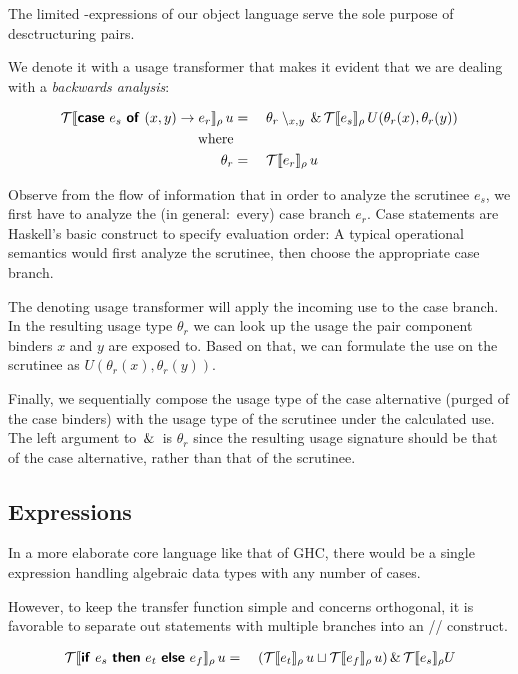 The limited -expressions of our object language serve the sole purpose of desctructuring pairs.

We denote it with a usage transformer that makes it evident that we are dealing with a \emph{backwards analysis}:

\begin{alignat*}{2}
  \mathcal{T}\llbracket\text{\textsf{\textbf{case}}}~e_s~\text{\textsf{\textbf{of}}}~(x,y)\rightarrow e_r\rrbracket_{\rho}\,u &{}={}&& \theta_r\setminus_{x,y} \,\&\, \mathcal{T}\llbracket e_s\rrbracket_{\rho}\,U(\theta_r(x),\theta_r(y)) \\
   \text{where} \\
   \theta_r &{}={}&& \mathcal{T}\llbracket e_r\rrbracket_{\rho}\,u 
\end{alignat*}

Observe from the flow of information that in order to analyze the scrutinee $e_s$, we first have to analyze the (in general:\ every) case branch $e_r$. 
Case statements are Haskell's basic construct to specify evaluation order: 
A typical operational semantics would first analyze the scrutinee, then choose the appropriate case branch.

The denoting usage transformer will apply the incoming use to the case branch.
In the resulting usage type $\theta_r$ we can look up the usage the pair component binders $x$ and $y$ are exposed to.
Based on that, we can formulate the use on the scrutinee as $U(\theta_r(x), \theta_r(y))$.

Finally, we sequentially compose the usage type of the case alternative (purged of the case binders) with the usage type of the scrutinee under the calculated use.
The left argument to $\,\&\,$ is $\theta_r$ since the resulting usage signature should be that of the case alternative, rather than that of the scrutinee.

\subsection{ Expressions}

In a more elaborate core language like that of GHC, there would be a single  expression handling algebraic data types with any number of cases.

However, to keep the transfer function simple and concerns orthogonal, it is favorable to separate out  statements with multiple branches into an // construct.

\begin{alignat*}{2}
  \mathcal{T}\llbracket\text{\textsf{\textbf{if}}}~e_s~\text{\textsf{\textbf{then}}}~{e_t}~\text{\textsf{\textbf{else}}}~{e_f}\rrbracket_{\rho}\,u &{}={}&& (\mathcal{T}\llbracket e_t\rrbracket_{\rho}\,u \sqcup \mathcal{T}\llbracket e_f\rrbracket_{\rho}\,u) \,\&\, \mathcal{T}\llbracket e_s\rrbracket_{\rho} U \\
\end{alignat*}

